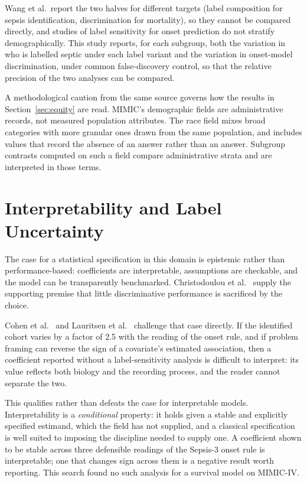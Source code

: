 Wang et al.\ report the two halves for different targets (label composition
for sepsis identification, discrimination for mortality), so they cannot be
compared directly, and studies of label sensitivity for onset prediction do not
stratify demographically. This study reports, for each subgroup, both the variation in who is labelled septic
under each label variant and the variation in onset-model discrimination, under
common false-discovery control, so that the relative precision of the two
analyses can be compared.

A methodological caution from the same source governs how the results in
Section~\ref{sec:equity} are read. MIMIC's demographic fields
are administrative records, not measured population attributes. The race field
mixes broad categories with more granular ones drawn from the same population,
and includes values that record the absence of an answer rather than an answer.
Subgroup contrasts computed on such a field compare administrative strata and
are interpreted in those terms.


\section{Interpretability and Label Uncertainty}
\label{sec:interpretability_survives}

The case for a statistical specification in this domain is epistemic rather
than performance-based: coefficients are interpretable, assumptions are
checkable, and the model can be transparently benchmarked. Christodoulou et
al.\ \cite{christodoulou2019cox} supply the supporting premise that little
discriminative performance is sacrificed by the choice.

Cohen et al.\ \cite{cohen2024subtle} and Lauritsen et al.\
\cite{lauritsen2021framing} challenge that case directly. If the identified
cohort varies by a factor of 2.5 with the reading of the onset rule, and if
problem framing can reverse the sign of a covariate's estimated association,
then a coefficient reported without a label-sensitivity analysis is difficult
to interpret: its value reflects both biology and the recording process, and
the reader cannot separate the two.

This qualifies rather than defeats the case for interpretable models.
Interpretability is a \emph{conditional} property: it holds given a stable and
explicitly specified estimand, which the field has not supplied, and a
classical specification is well suited to imposing the discipline needed to
supply one. A coefficient shown to be stable across three defensible readings
of the Sepsis-3 onset rule is interpretable; one that changes sign across them
is a negative result worth reporting. This search found no such analysis for a
survival model on MIMIC-IV.

